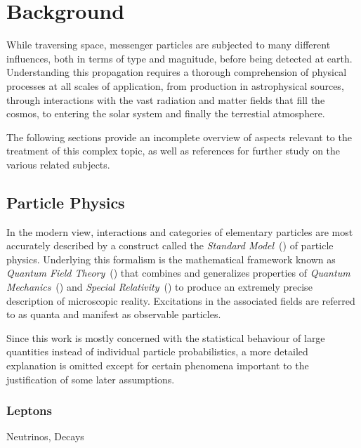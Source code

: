 \chapter{Background}
\label{ch:background}

While traversing space, messenger particles are subjected to many different influences, both in terms of type and magnitude, before being
detected at earth. Understanding this propagation requires a thorough comprehension of physical processes at all scales of application,
from production in astrophysical sources, through interactions with the vast radiation and matter fields that fill the cosmos, to entering
the solar system and finally the terrestial atmosphere.

The following sections provide an incomplete overview of aspects relevant to the treatment of this complex topic, as well as references
for further study on the various related subjects.



\section{Particle Physics}
\label{sec:particle}

In the modern view, interactions and categories of elementary particles are most accurately described by a construct called the
\emph{Standard Model}~() of particle physics. Underlying this formalism is the mathematical framework known as
\emph{Quantum Field Theory}~() that combines and generalizes properties of
\emph{Quantum Mechanics}~() and \emph{Special Relativity}~() to produce an extremely precise description
of microscopic reality. Excitations in the associated fields are referred to as quanta and manifest as observable particles.

Since this work is mostly concerned with the statistical behaviour of large quantities instead of individual particle probabilistics,
a more detailed explanation is omitted except for certain phenomena important to the justification of some later assumptions.



\subsection*{Leptons}
\label{sub:leptons}

Neutrinos, Decays



